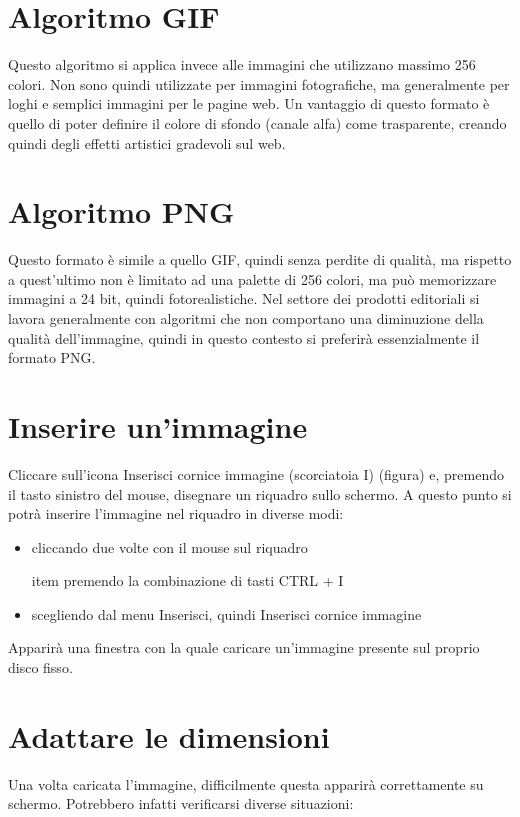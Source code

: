\documentclass[a4paper, 12pt]{book}
\begin{document}
\section{Algoritmo GIF}
Questo algoritmo si applica invece alle immagini che utilizzano massimo 256 colori. Non sono quindi utilizzate per immagini fotografiche, ma generalmente per loghi e semplici immagini per le pagine web. Un vantaggio di questo formato è quello di poter definire il colore di sfondo (canale alfa) come trasparente, creando quindi degli effetti artistici gradevoli sul web.

\section{Algoritmo PNG}
Questo formato è simile a quello GIF, quindi senza perdite di qualità, ma rispetto a quest'ultimo non è limitato ad una palette di 256 colori, ma può memorizzare immagini a 24 bit, quindi fotorealistiche.
Nel settore dei prodotti editoriali si lavora generalmente con algoritmi che non comportano una diminuzione della qualità dell'immagine, quindi in questo contesto si preferirà essenzialmente il formato PNG.

\section{Inserire un'immagine}
Cliccare sull'icona Inserisci cornice immagine (scorciatoia I) (figura) e, premendo il tasto sinistro del mouse, disegnare un riquadro sullo schermo. A questo punto si potrà inserire l'immagine nel riquadro in diverse modi:

\begin{itemize}
	\item cliccando due volte con il mouse sul riquadro

	item premendo la combinazione di tasti CTRL + I

	\item scegliendo dal menu Inserisci, quindi Inserisci cornice immagine

\end{itemize}

Apparirà una finestra con la quale caricare un'immagine presente sul proprio disco fisso.

\section{Adattare le dimensioni}
Una volta caricata l'immagine, difficilmente questa apparirà correttamente su schermo. Potrebbero infatti verificarsi diverse situazioni:
\end{document}
